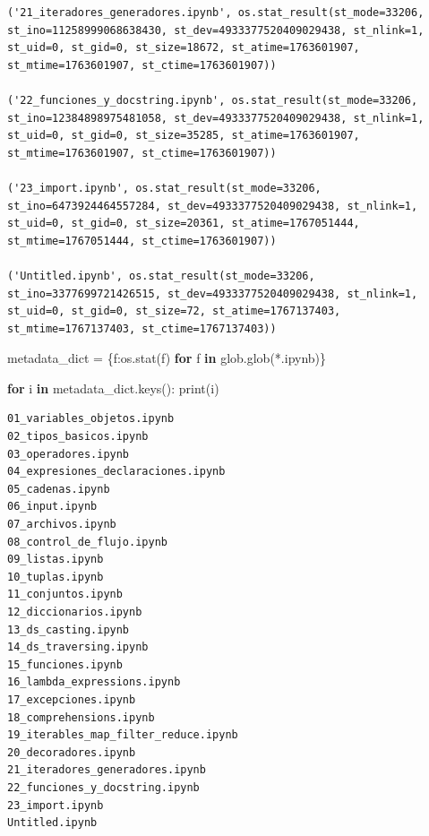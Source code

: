 \documentclass[
  spanish,
  letterpaper,
]{scrbook}
\newenvironment{Shaded}{\begin{snugshade}}{\end{snugshade}}
\newcommand{\BuiltInTok}[1]{\textcolor[rgb]{0.00,0.23,0.31}{#1}}
\newcommand{\ControlFlowTok}[1]{\textcolor[rgb]{0.00,0.23,0.31}{\textbf{#1}}}
\newcommand{\KeywordTok}[1]{\textcolor[rgb]{0.00,0.23,0.31}{\textbf{#1}}}
\newcommand{\NormalTok}[1]{\textcolor[rgb]{0.00,0.23,0.31}{#1}}
\newcommand{\OperatorTok}[1]{\textcolor[rgb]{0.37,0.37,0.37}{#1}}
\newcommand{\StringTok}[1]{\textcolor[rgb]{0.13,0.47,0.30}{#1}}
\theoremstyle{definition}
\theoremstyle{remark}
\begin{document}
\begin{verbatim}
('21_iteradores_generadores.ipynb', os.stat_result(st_mode=33206, st_ino=11258999068638430, st_dev=4933377520409029438, st_nlink=1, st_uid=0, st_gid=0, st_size=18672, st_atime=1763601907, st_mtime=1763601907, st_ctime=1763601907))

('22_funciones_y_docstring.ipynb', os.stat_result(st_mode=33206, st_ino=12384898975481058, st_dev=4933377520409029438, st_nlink=1, st_uid=0, st_gid=0, st_size=35285, st_atime=1763601907, st_mtime=1763601907, st_ctime=1763601907))

('23_import.ipynb', os.stat_result(st_mode=33206, st_ino=6473924464557284, st_dev=4933377520409029438, st_nlink=1, st_uid=0, st_gid=0, st_size=20361, st_atime=1767051444, st_mtime=1767051444, st_ctime=1763601907))

('Untitled.ipynb', os.stat_result(st_mode=33206, st_ino=3377699721426515, st_dev=4933377520409029438, st_nlink=1, st_uid=0, st_gid=0, st_size=72, st_atime=1767137403, st_mtime=1767137403, st_ctime=1767137403))
\end{verbatim}

\begin{Shaded}
\begin{Highlighting}[]
\NormalTok{metadata\_dict }\OperatorTok{=}\NormalTok{ \{f:os.stat(f) }\ControlFlowTok{for}\NormalTok{ f }\KeywordTok{in}\NormalTok{ glob.glob(}\StringTok{\textquotesingle{}*.ipynb\textquotesingle{}}\NormalTok{)\}}
\end{Highlighting}
\end{Shaded}

\begin{Shaded}
\begin{Highlighting}[]
\ControlFlowTok{for}\NormalTok{ i }\KeywordTok{in}\NormalTok{ metadata\_dict.keys():}
    \BuiltInTok{print}\NormalTok{(i)}
\end{Highlighting}
\end{Shaded}

\begin{verbatim}
01_variables_objetos.ipynb
02_tipos_basicos.ipynb
03_operadores.ipynb
04_expresiones_declaraciones.ipynb
05_cadenas.ipynb
06_input.ipynb
07_archivos.ipynb
08_control_de_flujo.ipynb
09_listas.ipynb
10_tuplas.ipynb
11_conjuntos.ipynb
12_diccionarios.ipynb
13_ds_casting.ipynb
14_ds_traversing.ipynb
15_funciones.ipynb
16_lambda_expressions.ipynb
17_excepciones.ipynb
18_comprehensions.ipynb
19_iterables_map_filter_reduce.ipynb
20_decoradores.ipynb
21_iteradores_generadores.ipynb
22_funciones_y_docstring.ipynb
23_import.ipynb
Untitled.ipynb
\end{verbatim}
\end{document}
